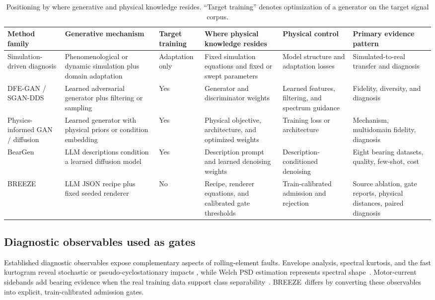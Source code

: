 \documentclass[a4paper,fleqn]{cas-sc}
\newcommand{\breeze}{BREEZE}
\begin{document}
\begin{table}[t]
\centering
\caption{Positioning by where generative and physical knowledge resides.
``Target training'' denotes optimization of a generator on the target signal
corpus.}
\label{tab:positioning}
\footnotesize
\setlength{\tabcolsep}{3pt}
\begin{tabular}{@{}>{\raggedright\arraybackslash}p{1.8cm}>{\raggedright\arraybackslash}p{2.5cm}>{\raggedright\arraybackslash}p{1.35cm}>{\raggedright\arraybackslash}p{2.6cm}>{\raggedright\arraybackslash}p{2.3cm}>{\raggedright\arraybackslash}p{3.3cm}@{}}
\toprule
Method family & Generative mechanism & Target training & Where physical knowledge resides & Physical control & Primary evidence pattern \\
\midrule
Simulation-driven diagnosis & Phenomenological or dynamic simulation plus domain adaptation & Adaptation only & Fixed simulation equations and fixed or swept parameters & Model structure and adaptation losses & Simulated-to-real transfer and diagnosis \\
DFE-GAN / SGAN-DDS & Learned adversarial generator plus filtering or sampling & Yes & Generator and discriminator weights & Learned features, filtering, and spectrum guidance & Fidelity, diversity, and diagnosis \\
Physics-informed GAN / diffusion & Learned generator with physical priors or condition embedding & Yes & Physical objective, architecture, and optimized weights & Training loss or architecture & Mechanism, multidomain fidelity, diagnosis \\
BearGen & LLM descriptions condition a learned diffusion model & Yes & Description prompt and learned denoising weights & Description-conditioned denoising & Eight bearing datasets, quality, few-shot, cost \\
\breeze & LLM JSON recipe plus fixed seeded renderer & No & Recipe, renderer equations, and calibrated gate thresholds & Train-calibrated admission and rejection & Source ablation, gate reports, physical distances, paired diagnosis \\
\bottomrule
\end{tabular}
\end{table}

\subsection{Diagnostic observables used as gates}

Established diagnostic observables expose complementary aspects of
rolling-element faults. Envelope analysis, spectral kurtosis, and the fast
kurtogram reveal stochastic or pseudo-cyclostationary impacts
\citep{randall2011bearing,antoni2006spectral,antoni2007kurtogram}, while Welch
PSD estimation represents spectral shape~\citep{welch1967psd}. Motor-current
sidebands add bearing evidence when the real training data support class
separability~\citep{schoen1995mcsa}. \breeze\ differs by converting these
observables into explicit, train-calibrated admission gates.
\end{document}
